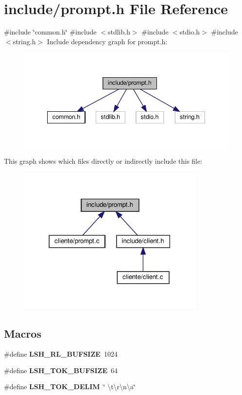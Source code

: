 \section{include/prompt.h File Reference}
\label{prompt_8h}
{\ttfamily \#include \char`\"{}common.\+h\char`\"{}}\newline
{\ttfamily \#include $<$stdlib.\+h$>$}\newline
{\ttfamily \#include $<$stdio.\+h$>$}\newline
{\ttfamily \#include $<$string.\+h$>$}\newline
Include dependency graph for prompt.\+h\+:\nopagebreak
\begin{figure}[H]
\begin{center}
\leavevmode
\includegraphics[width=340pt]{prompt_8h__incl}
\end{center}
\end{figure}
This graph shows which files directly or indirectly include this file\+:\nopagebreak
\begin{figure}[H]
\begin{center}
\leavevmode
\includegraphics[width=266pt]{prompt_8h__dep__incl}
\end{center}
\end{figure}
\subsection*{Macros}
\begin{DoxyCompactItemize}
\item 
\#define \textbf{ L\+S\+H\+\_\+\+R\+L\+\_\+\+B\+U\+F\+S\+I\+ZE}~1024
\item 
\#define \textbf{ L\+S\+H\+\_\+\+T\+O\+K\+\_\+\+B\+U\+F\+S\+I\+ZE}~64
\item 
\#define \textbf{ L\+S\+H\+\_\+\+T\+O\+K\+\_\+\+D\+E\+L\+IM}~\char`\"{} \textbackslash{}t\textbackslash{}r\textbackslash{}n\textbackslash{}a\char`\"{}
\end{DoxyCompactItemize}
